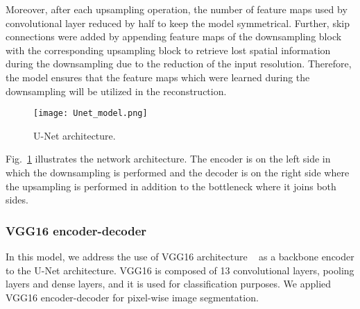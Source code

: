 Moreover, after each upsampling operation, the number of feature maps used by convolutional layer reduced by half to keep the model symmetrical. 
Further, skip connections were added by appending feature maps of the downsampling block with the corresponding upsampling block to retrieve lost spatial information during the downsampling due to the reduction of the input resolution.
Therefore, the model ensures that the feature maps which were learned during the downsampling will be utilized in the reconstruction. 
\begin{figure} [h!]
	\begin{center}
		\texttt{[image: Unet\_model.png]}
	\end{center}
	\caption{U-Net architecture.} 
	\label{fig:Unet}
\end{figure}
Fig.~\ref{fig:Unet}  illustrates the network architecture. 
The encoder is on the left side in which the downsampling is performed and the decoder is on the right side where the upsampling is performed in addition to the bottleneck where it joins both sides.
\subsubsection{VGG16 encoder-decoder}
In this model, we address the use of VGG16 architecture  ~\cite{simonyan2014very} as a backbone encoder to the U-Net architecture.
VGG16 is composed of 13 convolutional layers, pooling layers and dense layers, and it is used for classification purposes. 
We applied VGG16 encoder-decoder for pixel-wise image segmentation.

